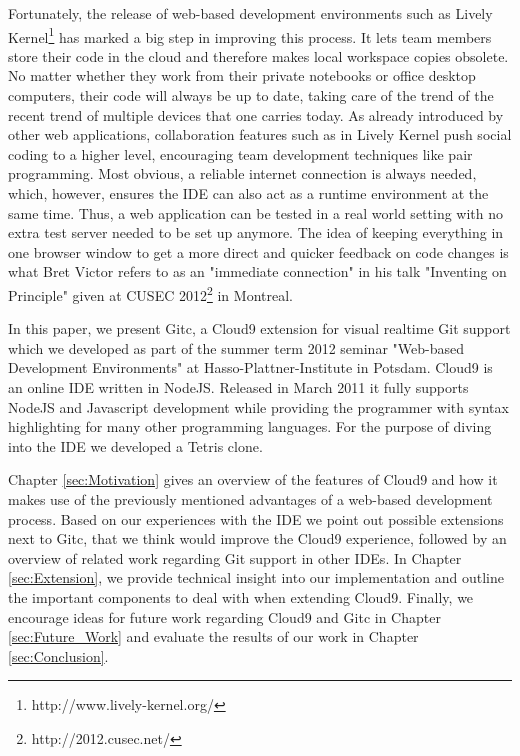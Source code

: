 Fortunately, the release of web-based development environments such as Lively Kernel\footnote{http://www.lively-kernel.org/}
has marked a big step in improving this process.
It lets team members store their code in the cloud and therefore makes local workspace copies obsolete.
No matter whether they work from their private notebooks or office desktop computers, their code will always be up to date,
taking care of the trend of the recent trend of multiple devices that one carries today.
As already introduced by other web applications, collaboration features such as in Lively Kernel push social coding
to a higher level, encouraging team development techniques like pair programming.
Most obvious, a reliable internet connection is always needed, which, however, ensures the IDE can also act as a runtime environment at the same time.
Thus, a web application can be tested in a real world setting with no extra test server needed to be set up anymore.
The idea of keeping everything in one browser window to get a more direct and quicker feedback on code changes is
what Bret Victor refers to as an "immediate connection" in his talk "Inventing on Principle" given at
CUSEC 2012\footnote{http://2012.cusec.net/} in Montreal.

In this paper, we present Gitc, a Cloud9 extension for visual realtime Git support which we developed as part of the
summer term 2012 seminar "Web-based Development Environments" at Hasso-Plattner-Institute in Potsdam.
Cloud9 is an online IDE written in NodeJS. Released in March 2011 it fully supports NodeJS and Javascript development
while providing the programmer with syntax highlighting for many other programming languages.
For the purpose of diving into the IDE we developed a Tetris clone.


Chapter \ref{sec:Motivation} gives an overview of the features of Cloud9 and how it makes use of the
previously mentioned advantages of a web-based development process.
Based on our experiences with the IDE we point out possible extensions next to Gitc, that we think would improve
the Cloud9 experience, followed by an overview of related work regarding Git support in other IDEs.
In Chapter \ref{sec:Extension}, we provide technical insight into our implementation and outline the important
components to deal with when extending Cloud9.
Finally, we encourage ideas for future work regarding Cloud9 and Gitc in Chapter \ref{sec:Future_Work} and
evaluate the results of our work in Chapter \ref{sec:Conclusion}.